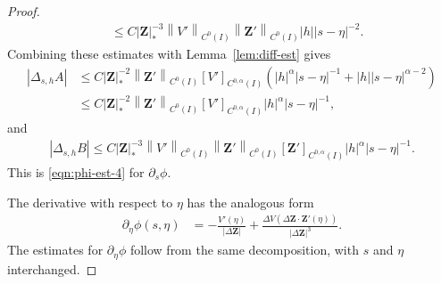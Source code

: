 \documentclass[11pt,reqno]{amsart}
\theoremstyle{plain}
\theoremstyle{definition}
\numberwithin{equation}{section}
\newcommand{\paren}[1]{\left(#1\right)}
\newcommand{\p}{\partial}
\newcommand{\bm}[1]{\boldsymbol{#1}}
\newcommand{\abs}[1]{\left\lvert #1 \right\rvert}
\newcommand{\norm}[1]{\left\lVert #1 \right\rVert}
\newcommand{\ci}[1]{C^{#1}(I)}
\begin{document}
\begin{proof}
\begin{equation}
\begin{aligned}
    &\le C\abs{\bm Z}_*^{-3}\norm{V'}_{\ci{0}}\norm{\bm Z'}_{\ci{0}}\abs{h}\abs{s-\eta}^{-2}.
\end{aligned}
\end{equation}
Combining these estimates with Lemma~\ref{lem:diff-est} gives
\begin{equation}
\begin{aligned}
    \abs{\Delta_{s,h}A} &\le C\abs{\bm Z}_*^{-2}\norm{\bm Z'}_{\ci{0}}[V']_{\ci{0,\alpha}} \paren{ \abs{h}^\alpha\abs{s-\eta}^{-1} + \abs{h}\abs{s-\eta}^{\alpha-2} } \\
    &\le C\abs{\bm Z}_*^{-2}\norm{\bm Z'}_{\ci{0}}[V']_{\ci{0,\alpha}}  \abs{h}^\alpha\abs{s-\eta}^{-1},
\end{aligned}
\end{equation}
and
\begin{equation}
\begin{aligned}
    \abs{\Delta_{s,h}B} \le C \abs{\bm Z}_*^{-3}\norm{V'}_{\ci{0}}\norm{\bm Z'}_{\ci{0}}[\bm Z']_{\ci{0,\alpha}} \abs{h}^\alpha  \abs{s-\eta}^{-1}  .
\end{aligned}
\end{equation}
This is \eqref{eqn:phi-est-4} for $\p_s\phi$.

The derivative with respect to $\eta$ has the analogous form
\begin{align}
    \p_\eta\phi(s,\eta) &= -\frac{V'(\eta)}{\abs{\Delta\bm Z}} + \frac{\Delta V\paren{\Delta \bm Z\cdot\bm Z'(\eta)}}{\abs{\Delta\bm Z}^3}.
\end{align}
The estimates for $\p_\eta\phi$ follow from the same decomposition,
with $s$ and $\eta$ interchanged.
\end{proof}
\end{document}
